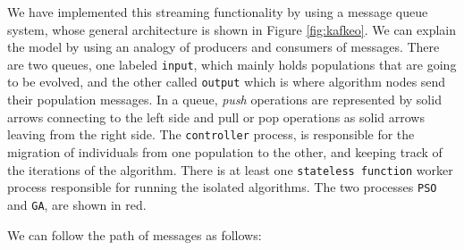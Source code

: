 \documentclass[runningheads]{llncs}
\begin{document}
We have implemented this streaming functionality by using a message
queue system, whose general architecture is shown in Figure
\ref{fig:kafkeo}. We can explain the model by using an analogy of
producers and consumers of messages. There are two queues, one labeled
\texttt{input}, which mainly holds populations that are going to be
evolved, and the other called \texttt{output} which is where algorithm
nodes send their population messages. In a queue, {\em push}
operations are represented by solid arrows connecting to the left side
and pull or pop operations as solid arrows leaving from the right
side. The \texttt{controller} process, is responsible for the
migration of individuals from one population to the other, and keeping
track of the iterations of the algorithm. There is at least one
\texttt{stateless function} worker process responsible for running the
isolated algorithms. The two processes \texttt{PSO} and \texttt{GA},
are shown in red.

We can follow the path of messages as follows:
\end{document}
